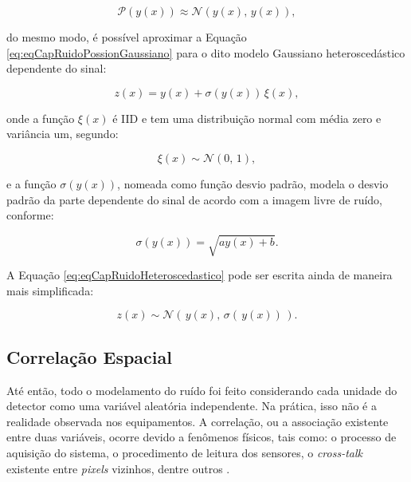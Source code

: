 \begin{equation}
\mathcal{P}(y(x)) \approx \mathcal{N}(y(x),\,y(x)),
\label{eq:eqCapRuidoPossionGaussianoAproximacao}
\end{equation}

\noindent do mesmo modo, é possível aproximar  a Equação \ref{eq:eqCapRuidoPossionGaussiano} para o dito modelo Gaussiano heteroscedástico dependente do sinal:

\begin{equation}
z(x) = y(x) + \sigma(y(x)) \, \xi(x),
\label{eq:eqCapRuidoHeteroscedastico}
\end{equation}

\noindent onde a função  $\xi(x)$ é \acs{IID} e tem uma distribuição normal com média zero e variância um, segundo:

\begin{equation}
\xi(x) \sim  \mathcal{N}(0,\,1),
\label{eq:eqCapRuidoHeteroscedastico1}
\end{equation}

\noindent e a função $\sigma(y(x)) $, nomeada como função desvio padrão, modela o desvio padrão da parte dependente do sinal de acordo com a imagem livre de ruído, conforme:

\begin{equation}
\sigma(y(x)) = \sqrt{ay(x)+b}.
\label{eq:eqCapRuidoHeteroscedasticoStd}
\end{equation} 

A Equação \ref{eq:eqCapRuidoHeteroscedastico} pode ser escrita ainda de maneira mais simplificada:

\begin{equation}
z(x) \sim  \mathcal{N}(\,y(x),\,\sigma(\,y(x)) \,).
\label{eq:eqCapRuidoHeteroscedasticoSimplificado}
\end{equation}

\subsection{Correlação Espacial}\label{Correlação}

Até então, todo o modelamento do ruído foi feito considerando cada unidade do detector como uma variável aleatória independente. Na prática, isso não é a realidade observada nos equipamentos. A correlação, ou a associação existente entre duas variáveis, ocorre devido a fenômenos físicos, tais como: o processo de aquisição do sistema, o procedimento de leitura dos sensores, o \textit{cross-talk} existente entre \textit{pixels} vizinhos, dentre outros \cite{morettin2010,bertalmiodenoising2018}. 

